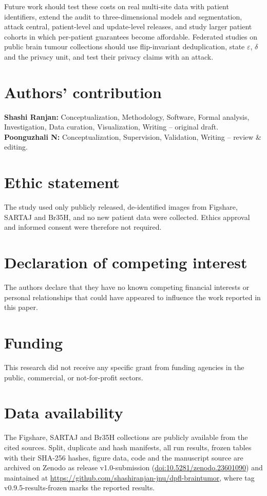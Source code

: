 \documentclass[preprint,12pt]{elsarticle}
\begin{document}
Future work should test these costs on real multi-site data with patient identifiers, extend the audit to
three-dimensional models and segmentation, attack central, patient-level and update-level releases, and study larger
patient cohorts in which per-patient guarantees become affordable. Federated studies on public brain tumour collections should use flip-invariant deduplication, state
$\varepsilon$, $\delta$ and the privacy unit, and test their privacy claims with an attack.

\section*{Authors' contribution}
\textbf{Shashi Ranjan:} Conceptualization, Methodology, Software, Formal analysis, Investigation, Data curation,
Visualization, Writing -- original draft. \textbf{Poonguzhali N:} Conceptualization, Supervision, Validation,
Writing -- review \& editing.

\section*{Ethic statement}
The study used only publicly released, de-identified images from Figshare, SARTAJ and Br35H, and no new patient data
were collected. Ethics approval and informed consent were therefore not required.

\section*{Declaration of competing interest}
The authors declare that they have no known competing financial interests or personal relationships that could have
appeared to influence the work reported in this paper.

\section*{Funding}
This research did not receive any specific grant from funding agencies in the public, commercial, or not-for-profit
sectors.

\section*{Data availability}
The Figshare,\cite{chengdata} SARTAJ\cite{sartajdata} and Br35H\cite{br35hdata} collections are publicly available from
the cited sources. Split, duplicate and hash manifests, all run results, frozen tables with their SHA-256 hashes,
figure data, code and the manuscript source are archived on Zenodo as release v1.0-submission
(\href{https://doi.org/10.5281/zenodo.23601090}{doi:10.5281/zenodo.23601090})\cite{zenodocode} and maintained at
\url{https://github.com/shashiranjan-jnu/dpfl-braintumor}, where tag v0.9.5-results-frozen marks the reported
results.
\end{document}
